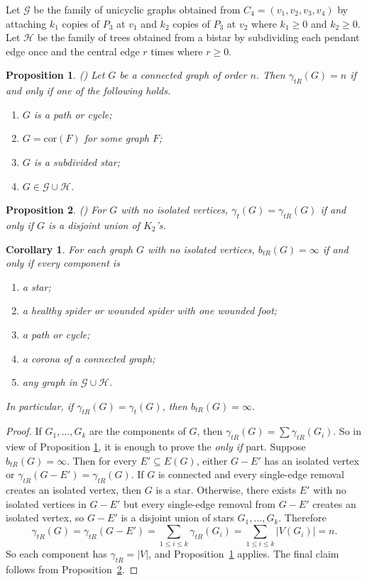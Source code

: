 \documentclass[12pt,reqno]{amsart}
\theoremstyle{plain}
\newtheorem{prelem}{{\bf Proposition}}
\newtheorem{corollary}[theorem]{Corollary}
\numberwithin{equation}{section}
\begin{document}
Let $\mathcal{G}$ be the family of unicyclic graphs obtained from $C_4 = (v_1, v_2, v_3, v_4)$
by attaching $k_1$ copies of $P_3$ at $v_1$ and $k_2$ copies of $P_3$ at $v_2$ where $k_1 \geq 0$ and $k_2 \geq 0$. Let $\mathcal{H}$ be the family of trees obtained from a bistar by
subdividing each pendant edge once and the central edge $r$ times where $r \geq 0$.

\begin{prelem}\label{ahah1}
(\cite[Theorem~13]{ah1}) Let $G$ be a connected graph of order $n$. Then $\gamma_{tR}(G)=n$ if and only if one of the following holds.
\begin{enumerate}
\item $G$ is a path or cycle;
\item $G=\mathrm{cor}(F)$ for some graph $F$;
\item $G$ is a subdivided star;
\item $G\in\mathcal{G}\cup\mathcal{H}$.
\end{enumerate}
\end{prelem}

\begin{prelem}\label{th4} 
(\cite[Theorem~6]{ah1}) For $G$ with no isolated vertices, $\gamma_t(G)=\gamma_{tR}(G)$ if and only if $G$ is a disjoint union of $K_2$'s.
\end{prelem}

\begin{corollary}\label{infty}
For each graph $G$ with no isolated vertices, $b_{tR}(G)=\infty$ if and only if every component is
\begin{enumerate}
\item a star;
\item a healthy spider or wounded spider with one wounded foot;
\item a path or cycle;
\item a corona of a connected graph;
\item any graph in $\mathcal{G}\cup\mathcal{H}$.
\end{enumerate}
In particular, if $\gamma_{tR}(G)=\gamma_t(G)$, then $b_{tR}(G)=\infty$.
\end{corollary}
\begin{proof}
If $G_1,\dots,G_k$ are the components of $G$, then $\gamma_{tR}(G)=\sum\gamma_{tR}(G_i)$.
So in view of Proposition \ref{ahah1}, it is enough to prove the \textit{only if } part. Suppose $b_{tR}(G)=\infty$. Then for every $E'\subseteq E(G)$, either $G-E'$ has an isolated vertex or $\gamma_{tR}(G-E')=\gamma_{tR}(G)$. If $G$ is connected and every single-edge removal creates an isolated vertex, then $G$ is a star. Otherwise, there exists $E'$ with no isolated vertices in $G-E'$ but every single-edge removal from $G-E'$ creates an isolated vertex, so $G-E'$ is a disjoint union of stars $G_1,\dots,G_k$. Therefore 
$$\gamma_{tR}(G)=\gamma_{tR}(G-E')=\sum_{1\leq i \leq k}\gamma_{tR}(G_i)=\sum_{1\leq i \leq k}|V(G_i)|=n.$$
So each component has $\gamma_{tR}=|V|$, and Proposition~\ref{ahah1} applies. The final claim follows from Proposition~\ref{th4}.
\end{proof}
\end{document}

